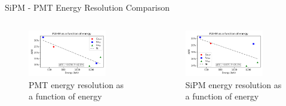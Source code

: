 \begin{frame}{SiPM - PMT Energy Resolution Comparison}
    \begin{columns}
        \begin{column}{0.5\textwidth}
            \begin{figure}
                \centering
                \includegraphics[width=0.8\textwidth]{images/PMT_dE_ov_E.png}
                \caption{PMT energy resolution as a function of energy}
            \end{figure}
        \end{column}
        \begin{column}{0.5\textwidth}
            \begin{figure}
                \centering
                \includegraphics[width=0.8\textwidth]{images/SiPM_dE_ov_E.png}
                \caption{SiPM energy resolution as a function of energy}
            \end{figure}
        \end{column}
    \end{columns}
\end{frame}

